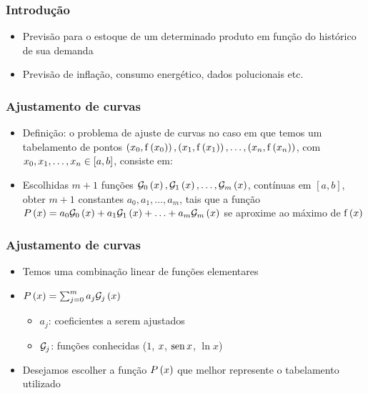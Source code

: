 \begin{frame}
\frametitle{Introdução}

\begin{itemize}[<+->]
  \item Previsão para o estoque de um determinado produto em função do histórico de sua demanda

  \item Previsão de inflação, consumo energético, dados polucionais etc.
\end{itemize}
\end{frame}

\begin{frame}
\frametitle{Ajustamento de curvas}

\begin{itemize}
  \item Definição: o problema de ajuste de curvas no caso em que temos um tabelamento de pontos 
$\left(x_0, \mathrm{f}\left(x_0\right)\right), \left(x_1, \mathrm{f}\left(x_1\right) \right), \ldots, \left(x_n, \mathrm{f}\left(x_n\right) \right) $, com $x_0, x_1, \ldots, x_n \in [a,b]$, consiste em:
  
  \item Escolhidas $m+1$ funções 
$\mathcal{G}_0\left(x\right), \mathcal{G}_1\left(x\right), \ldots, \mathcal{G}_m\left(x\right) $, contínuas em $[a,b]$, obter $m+1$ constantes $a_0, a_1, \ldots, a_m$, tais que a função $P\left(x \right) = a_0 \mathcal{G}_0\left(x\right) + a_1 \mathcal{G}_1 \left(x\right) + \ldots + a_m \mathcal{G}_m \left(x\right) $ se aproxime ao máximo de $\mathrm{f}\left(x\right) $
\end{itemize}
\end{frame}

\begin{frame}
\frametitle{Ajustamento de curvas}

\begin{itemize}
  \item Temos uma combinação linear de funções elementares
  \item $P\left(x\right) = \sum_{j=0}^m a_j \mathcal{G}_j \left(x\right) $
    \begin{itemize}
      \item $a_j$: coeficientes a serem ajustados
      \item $\mathcal{G}_j$: funções conhecidas ($1$, $x$, $\operatorname{\text{sen}} x$, $\ln x$)
    \end{itemize}
  \item Desejamos escolher a função $P\left(x\right)$ que melhor represente o tabelamento utilizado
\end{itemize}
\end{frame}

